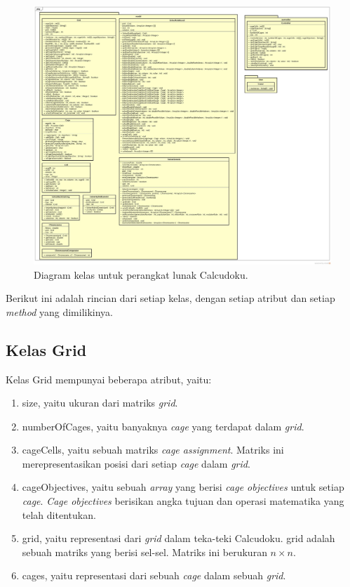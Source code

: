 \begin{figure}
\centering
\captionsetup{justification=centering}
\includegraphics[scale=0.2]{Gambar/Perancangan/DiagramKelas.jpg}
\caption[Diagram kelas untuk perangkat lunak Calcudoku.]{Diagram kelas untuk perangkat lunak Calcudoku.}
\label{fig:diagramkelas}
\end{figure}

Berikut ini adalah rincian dari setiap kelas, dengan setiap atribut dan setiap \textit{method} yang dimilikinya.

\subsection{Kelas Grid}
\label{sec:kelasgrid}

Kelas Grid mempunyai beberapa atribut, yaitu:

\begin{enumerate}
\item size, yaitu ukuran dari matriks \textit{grid}.
\item numberOfCages, yaitu banyaknya \textit{cage} yang terdapat dalam \textit{grid}.
\item cageCells, yaitu sebuah matriks \textit{cage assignment}. Matriks ini merepresentasikan posisi dari setiap \textit{cage} dalam \textit{grid}.
\item cageObjectives, yaitu sebuah \textit{array} yang berisi \textit{cage objectives} untuk setiap \textit{cage}. \textit{Cage objectives} berisikan angka tujuan dan operasi matematika yang telah ditentukan.
\item grid, yaitu representasi dari \textit{grid} dalam teka-teki Calcudoku. grid adalah sebuah matriks yang berisi sel-sel. Matriks ini berukuran \begin{math} n \times n\end{math}.
\item cages, yaitu representasi dari sebuah \textit{cage} dalam sebuah \textit{grid}.
\end{enumerate}

